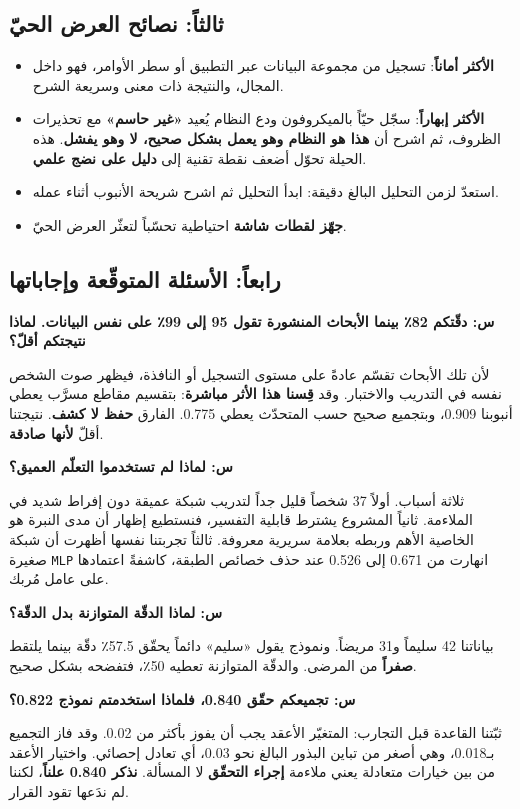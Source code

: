 \documentclass[12pt,a4paper]{report}
\newcommand{\E}[1]{\textenglish{\texttt{#1}}}
\newcommand{\N}[1]{\textenglish{#1}}
\newcommand{\qism}[1]{\subsection*{#1}}
\begin{document}
\qism{ثالثاً: نصائح العرض الحيّ}

\begin{itemize}
  \item \textbf{الأكثر أماناً}: تسجيل من مجموعة البيانات عبر التطبيق أو سطر
        الأوامر، فهو داخل المجال، والنتيجة ذات معنى وسريعة الشرح.
  \item \textbf{الأكثر إبهاراً}: سجّل حيّاً بالميكروفون ودع النظام يُعيد
        \textbf{«غير حاسم»} مع تحذيرات الظروف، ثم اشرح أن \textbf{هذا هو النظام وهو
        يعمل بشكل صحيح، لا وهو يفشل}. هذه الحيلة تحوّل أضعف نقطة تقنية إلى
        \textbf{دليل على نضج علمي}.
  \item استعدّ لزمن التحليل البالغ دقيقة: ابدأ التحليل ثم اشرح شريحة الأنبوب أثناء
        عمله.
  \item \textbf{جهّز لقطات شاشة} احتياطية تحسّباً لتعثّر العرض الحيّ.
\end{itemize}

\qism{رابعاً: الأسئلة المتوقّعة وإجاباتها}

\textbf{س: دقّتكم \N{82}٪ بينما الأبحاث المنشورة تقول \N{95} إلى \N{99}٪ على نفس
البيانات. لماذا نتيجتكم أقلّ؟}

لأن تلك الأبحاث تقسّم عادةً على مستوى التسجيل أو النافذة، فيظهر صوت الشخص نفسه في
التدريب والاختبار. وقد \textbf{قِسنا هذا الأثر مباشرة}: بتقسيم مقاطع مسرَّب يعطي
أنبوبنا \N{0.909}، وبتجميع صحيح حسب المتحدّث يعطي \N{0.775}. الفارق \textbf{حفظ لا
كشف}. نتيجتنا أقلّ \textbf{لأنها صادقة}.

\textbf{س: لماذا لم تستخدموا التعلّم العميق؟}

ثلاثة أسباب. أولاً \N{37} شخصاً قليل جداً لتدريب شبكة عميقة دون إفراط شديد في
الملاءمة. ثانياً المشروع يشترط قابلية التفسير، فنستطيع إظهار أن مدى النبرة هو
الخاصية الأهم وربطه بعلامة سريرية معروفة. ثالثاً تجربتنا نفسها أظهرت أن شبكة صغيرة
\E{MLP} انهارت من \N{0.671} إلى \N{0.526} عند حذف خصائص الطبقة، كاشفةً اعتمادها على
عامل مُربك.

\textbf{س: لماذا الدقّة المتوازنة بدل الدقّة؟}

بياناتنا \N{42} سليماً و\N{31} مريضاً. ونموذج يقول «سليم» دائماً يحقّق \N{57.5}٪
دقّة بينما يلتقط \textbf{صفراً} من المرضى. والدقّة المتوازنة تعطيه \N{50}٪، فتفضحه
بشكل صحيح.

\textbf{س: تجميعكم حقّق \N{0.840}، فلماذا استخدمتم نموذج \N{0.822}؟}

ثبّتنا القاعدة قبل التجارب: المتغيّر الأعقد يجب أن يفوز بأكثر من \N{0.02}. وقد فاز
التجميع بـ\N{0.018}، وهي أصغر من تباين البذور البالغ نحو \N{0.03}، أي تعادل
إحصائي. واختيار الأعقد من بين خيارات متعادلة يعني ملاءمة \textbf{إجراء التحقّق} لا
المسألة. \textbf{نذكر \N{0.840} علناً}، لكننا لم ندَعها تقود القرار.
\end{document}

